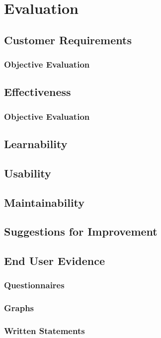 \chapter{Evaluation}

\section{Customer Requirements}

\subsection{Objective Evaluation}

\section{Effectiveness}

\subsection{Objective Evaluation}

\section{Learnability}

\section{Usability}

\section{Maintainability}

\section{Suggestions for Improvement}

\section{End User Evidence}

\subsection{Questionnaires}

\subsection{Graphs}

\subsection{Written Statements}